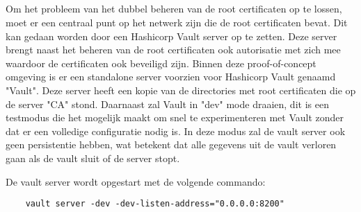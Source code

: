 \subsection{}
\label{subsec:Installeren_van_een_Vault_server}

Om het probleem van het dubbel beheren van de root certificaten op te lossen, moet er een centraal punt op het netwerk zijn die de root certificaten bevat. Dit kan gedaan worden door een Hashicorp Vault server op te zetten. Deze server brengt naast het beheren van de root certificaten ook autorisatie met zich mee waardoor de certificaten ook beveiligd zijn.
Binnen deze proof-of-concept omgeving is er een standalone server voorzien voor Hashicorp Vault genaamd "Vault". Deze server heeft een kopie van de directories met root certificaten die op de server "CA" stond. Daarnaast zal Vault in "dev" mode draaien, dit is een testmodus die het mogelijk maakt om snel te experimenteren met Vault zonder dat er een volledige configuratie nodig is. 
In deze modus zal de vault server ook geen persistentie hebben, wat betekent dat alle gegevens uit de vault verloren gaan als de vault sluit of de server stopt.

De vault server wordt opgestart met de volgende commando:
\begin{verbatim}
    vault server -dev -dev-listen-address="0.0.0.0:8200"
\end{verbatim}

